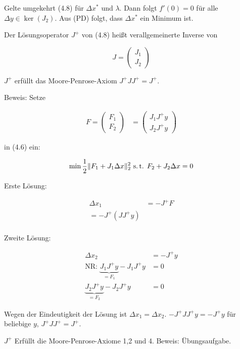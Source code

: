 Gelte umgekehrt (4.8) für $\Delta x^*$ und $\lambda$. Dann folgt $f'(0) = 0$ für alle $\Delta y \in \ker(J_2)$. Aus (PD) folgt, dass $\Delta x^*$ ein Minimum ist.


Der Lösungsoperator $J^+$ von (4.8) heißt verallgemeinerte Inverse von

\[ J = \begin{pmatrix} J_1 \\ J_2 \end{pmatrix} \]


$J^+$ erfüllt das Moore-Penrose-Axiom $J^+ J J^+ = J^+$.

Beweis: Setze

\begin{align*}
F = \begin{pmatrix} F_1 \\ F_2 \end{pmatrix} &= \begin{pmatrix} J_1 J^+ y \\ J_2 J^+ y \end{pmatrix}
\end{align*}

in (4.6) ein:

\[ \min \frac 12 \| F_1 + J_1 \Delta x\|_2^2 \text{ s.\,t. } F_2+ J_2 \Delta x = 0 \]

Erste Lösung:

\begin{align*}
\Delta x_1 &= - J^+ F \\
= - J^+ (J J^+ y) \\
\end{align*}

Zweite Lösung:

\begin{align*}
\Delta x_2 &= - J^+ y\\
\text{NR: } \underbrace{J_1 J^+ y}_{=F_1} - J_1 J^+ y &= 0 \\
\underbrace{J_2 J^+ y}_{=F_2} - J_2 J^+ y &= 0
\end{align*}

Wegen der Eindeutigkeit der Lösung ist $\Delta x_1 = \Delta x_2$. $-J^+ J J^+ y = -J^+y$ für beliebige $y$, $J^+ J J^+ = J^+$.


$J^+$ Erfüllt die Moore-Penrose-Axiome 1,2 und 4. Beweis: Übungsaufgabe.

